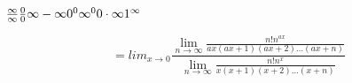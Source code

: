 \documentclass[11pt]{amsart}
\begin{document}
$\frac{\infty}{\infty}\\ \\
\frac{0}{0}\\ \\
\infty-\infty \\ \\
0^{0} \\ \\
\infty^{0} \\ \\
0\cdot \infty\\ \\
1^{\infty}$


$$=lim_{x\to0}\frac{\lim_{n\to\infty} \frac{n!n^{ax}}{ax(ax+1)(ax+2)\dots(ax+n)}}{\lim_{n\to\infty} \frac{n!n^{x}}{x(x+1)(x+2)\dots(x+n)}}$$
\end{document}
